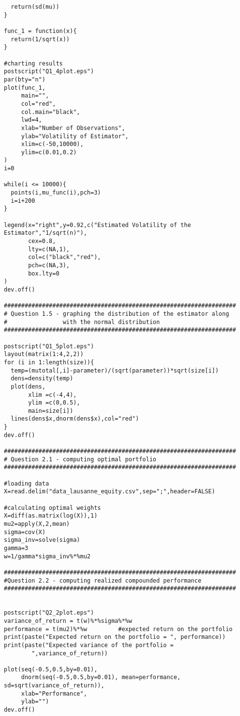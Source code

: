 \begin{appendices}
\begin{verbatim}
  return(sd(mu))
}

func_1 = function(x){
  return(1/sqrt(x))
}

#charting results
postscript("Q1_4plot.eps")
par(bty="n")
plot(func_1,
     main="",
     col="red",
     col.main="black",
     lwd=4,
     xlab="Number of Observations",
     ylab="Volatility of Estimator",
     xlim=c(-50,10000),
     ylim=c(0.01,0.2)
)
i=0

while(i <= 10000){
  points(i,mu_func(i),pch=3)
  i=i+200
}

legend(x="right",y=0.92,c("Estimated Volatility of the Estimator","1/sqrt(n)"),
       cex=0.8,
       lty=c(NA,1),
       col=c("black","red"),
       pch=c(NA,3),
       box.lty=0
)
dev.off()

###################################################################
# Question 1.5 - graphing the distribution of the estimator along
#                with the normal distribution
###################################################################

postscript("Q1_5plot.eps")
layout(matrix(1:4,2,2))
for (i in 1:length(size)){
  temp=(mutotal[,i]-parameter)/(sqrt(parameter))*sqrt(size[i])
  dens=density(temp)
  plot(dens, 
       xlim =c(-4,4),
       ylim =c(0,0.5),
       main=size[i])
  lines(dens$x,dnorm(dens$x),col="red")
}
dev.off()

###################################################################
# Question 2.1 - computing optimal portfolio
###################################################################

#loading data
X=read.delim("data_lausanne_equity.csv",sep=";",header=FALSE)

#calculating optimal weights
X=diff(as.matrix(log(X)),1)
mu2=apply(X,2,mean) 
sigma=cov(X)
sigma_inv=solve(sigma)
gamma=3
w=1/gamma*sigma_inv%*%mu2

###################################################################
#Question 2.2 - computing realized compounded performance
###################################################################


postscript("Q2_2plot.eps")
variance_of_return = t(w)%*%sigma%*%w
performance = t(mu2)%*%w         #expected return on the portfolio               
print(paste("Expected return on the portfolio = ", performance))
print(paste("Expected variance of the portfolio =
        ",variance_of_return))
        
plot(seq(-0.5,0.5,by=0.01), 
     dnorm(seq(-0.5,0.5,by=0.01), mean=performance, sd=sqrt(variance_of_return)),
     xlab="Performance",
     ylab="")
dev.off()


\end{verbatim}

\end{appendices}


